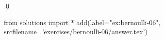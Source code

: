 
\begin{ex} 
  \label{ex:bernoulli-06}
  
  \qed
\end{ex} 
\begin{python0}
from solutions import *
add(label="ex:bernoulli-06",
    srcfilename='exercises/bernoulli-06/answer.tex') 
\end{python0}
